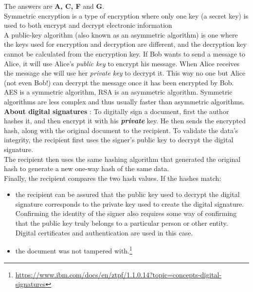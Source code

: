 \documentclass[en]{sourcefiles/eplexam}
\begin{document}
\begin{solution}
The answers are \textbf{A, C, F} and \textbf{G}.\\

\noindent Symmetric encryption is a type of encryption where only one key (a secret key) is used to both encrypt and decrypt electronic information\\

\noindent A public-key algorithm (also known as an asymmetric algorithm) is one where the keys used for encryption and decryption are different, and the decryption key cannot be calculated from the encryption key. If Bob wants to send a message to Alice, it will use Alice's \textit{public key} to encrypt his message. When Alice receives the message she will use her \textit{private key} to decrypt it. This way no one but Alice (not even Bob!) can decrypt the message once it has been encrypted by Bob.\\

\noindent AES is a symmetric algorithm, RSA is an asymmetric algorithm. Symmetric algorithms are less complex and thus usually faster than asymmetric algorithms.\\


\noindent \textbf{About digital signatures} : To digitally sign a document, first the author hashes it, and then encrypt it with his \textbf{\textit{private}} key. He then sends the encrypted hash, along with the original document to the recipient. To validate the data's integrity, the recipient first uses the signer's public key to decrypt the digital signature.\\
The recipient then uses the same hashing algorithm that generated the original hash to generate a new one-way hash of the same data.\\
\noindent Finally, the recipient compares the two hash values. If the hashes match:
\begin{itemize}
    \item the recipient can be assured that the public key used to decrypt the digital signature corresponds to the private key used to create the digital signature. Confirming the identity of the signer also requires some way of confirming that the public key truly belongs to a particular person or other entity. Digital certificates and authentication are used in this case.
    \item the document was not tampered with.\footnote{\url{https://www.ibm.com/docs/en/ztpf/1.1.0.14?topic=concepts-digital-signatures}}
\end{itemize}
\end{solution}
\end{document}
